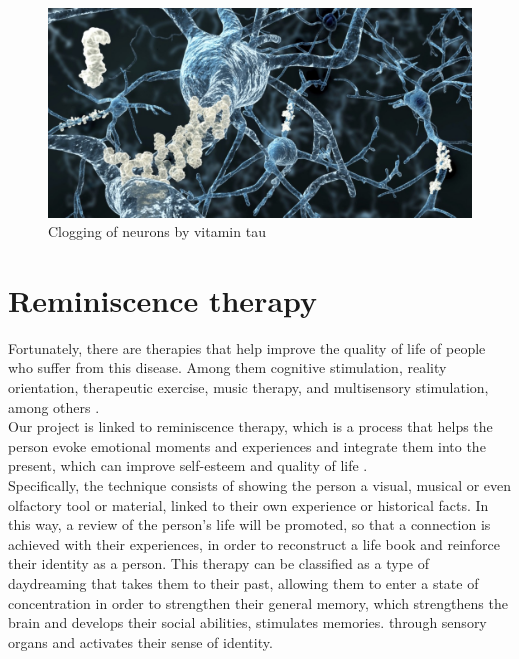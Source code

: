 \begin{figure}[h]
	\centering
	\includegraphics[width = 1 \textwidth]{Imagenes/Vectorial/proteina-tau.jpg}
	\caption{Clogging of neurons by vitamin tau \citep{tau}}
	\label{fig:tau}
\end{figure}


\section{Reminiscence therapy}

Fortunately, there are therapies that help improve the quality of life of people who suffer from this disease. Among them cognitive stimulation, reality orientation, therapeutic exercise, music therapy, and multisensory stimulation, among others \citep{SAS2020}.\\

Our project is linked to reminiscence therapy, which is a process that helps the person evoke emotional moments and experiences and integrate them into the present, which can improve self-esteem and quality of life \citep{gonzalez2015terapia}.\\

Specifically, the technique consists of showing the person a visual, musical or even olfactory tool or material, linked to their own experience or historical facts. In this way, a review of the person's life will be promoted, so that a connection is achieved with their experiences, in order to reconstruct a life book and reinforce their identity as a person.   This therapy can be classified as a type of daydreaming that takes them to their past, allowing them to enter a state of concentration in order to strengthen their general memory, which strengthens the brain and develops their social abilities, stimulates memories. through sensory organs and activates their sense of identity.\\



